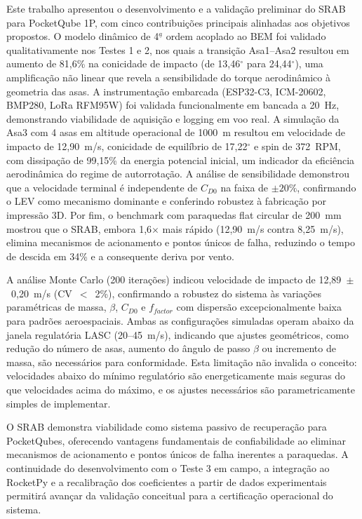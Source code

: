 \documentclass[12pt,fleqn]{article}
\begin{document}
Este trabalho apresentou o desenvolvimento e a validação preliminar do SRAB para PocketQube 1P, com cinco contribuições principais alinhadas aos objetivos propostos. O modelo dinâmico de 4$^{\underline{a}}$ ordem acoplado ao BEM foi validado qualitativamente nos Testes 1 e 2, nos quais a transição Asa1--Asa2 resultou em aumento de 81,6\% na conicidade de impacto (de 13,46$^\circ$ para 24,44$^\circ$), uma amplificação não linear que revela a sensibilidade do torque aerodinâmico à geometria das asas. A instrumentação embarcada (ESP32-C3, ICM-20602, BMP280, LoRa RFM95W) foi validada funcionalmente em bancada a 20~Hz, demonstrando viabilidade de aquisição e logging em voo real. A simulação da Asa3 com 4 asas em altitude operacional de 1000~m resultou em velocidade de impacto de 12,90~m/s, conicidade de equilíbrio de 17,22$^\circ$ e spin de 372~RPM, com dissipação de 99,15\% da energia potencial inicial, um indicador da eficiência aerodinâmica do regime de autorrotação. A análise de sensibilidade demonstrou que a velocidade terminal é independente de $C_{D0}$ na faixa de $\pm20\%$, confirmando o LEV como mecanismo dominante e conferindo robustez à fabricação por impressão 3D. Por fim, o benchmark com paraquedas flat circular de 200~mm mostrou que o SRAB, embora 1,6$\times$ mais rápido (12,90~m/s contra 8,25~m/s), elimina mecanismos de acionamento e pontos únicos de falha, reduzindo o tempo de descida em 34\% e a consequente deriva por vento.

A análise Monte Carlo (200 iterações) indicou velocidade de impacto de 12,89~$\pm$~0,20~m/s (CV~$<$~2\%), confirmando a robustez do sistema às variações paramétricas de massa, $\beta$, $C_{D0}$ e $f_{factor}$ com dispersão excepcionalmente baixa para padrões aeroespaciais. Ambas as configurações simuladas operam abaixo da janela regulatória LASC (20--45~m/s), indicando que ajustes geométricos, como redução do número de asas, aumento do ângulo de passo $\beta$ ou incremento de massa, são necessários para conformidade. Esta limitação não invalida o conceito: velocidades abaixo do mínimo regulatório são energeticamente mais seguras do que velocidades acima do máximo, e os ajustes necessários são parametricamente simples de implementar.

O SRAB demonstra viabilidade como sistema passivo de recuperação para PocketQubes, oferecendo vantagens fundamentais de confiabilidade ao eliminar mecanismos de acionamento e pontos únicos de falha inerentes a paraquedas. A continuidade do desenvolvimento com o Teste 3 em campo, a integração ao RocketPy e a recalibração dos coeficientes a partir de dados experimentais permitirá avançar da validação conceitual para a certificação operacional do sistema.
\end{document}
